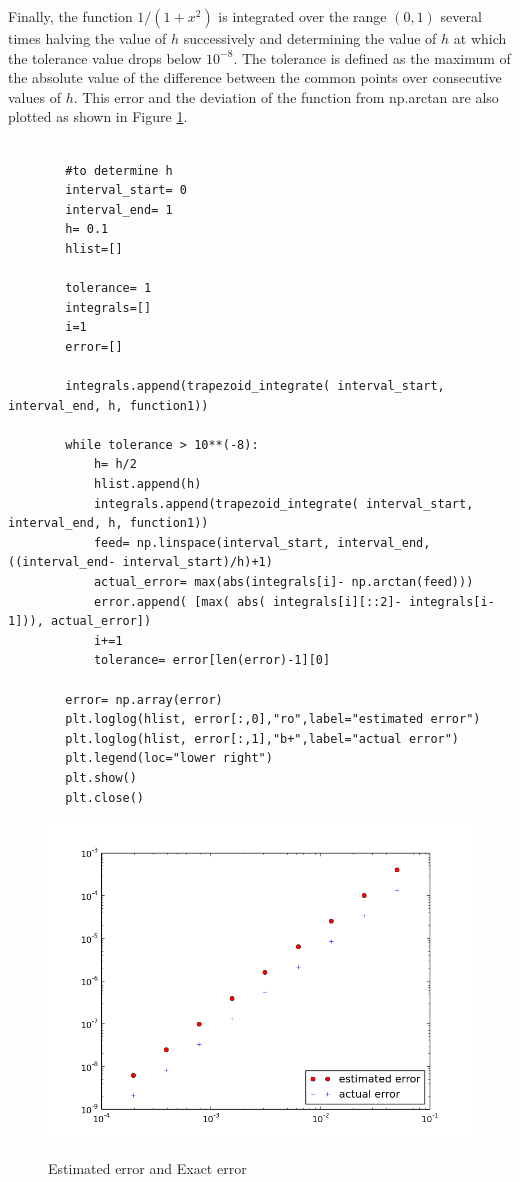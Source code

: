 \documentclass[a4paper, 12pt, margin= 1.25cm ]{article}
\begin{document}
\begin{enumerate}
		Finally, the function $1/(1+x^2)$ is integrated over the range $(0,1)$ several times halving the value of $h$ successively and determining the value of $h$ at which the tolerance value drops below $10^{-8}$. The tolerance is defined as the maximum of the absolute value of the difference between the common points over consecutive values of $h$. This error and the deviation of the function from np.arctan are also plotted as shown in Figure \ref{fig:figure3}.


		\begin{lstlisting}

		#to determine h
		interval_start= 0
		interval_end= 1
		h= 0.1
		hlist=[]

		tolerance= 1
		integrals=[]
		i=1
		error=[]

		integrals.append(trapezoid_integrate( interval_start, interval_end, h, function1))

		while tolerance > 10**(-8):
			h= h/2
			hlist.append(h)
			integrals.append(trapezoid_integrate( interval_start, interval_end, h, function1))
			feed= np.linspace(interval_start, interval_end,((interval_end- interval_start)/h)+1)
			actual_error= max(abs(integrals[i]- np.arctan(feed)))
			error.append( [max( abs( integrals[i][::2]- integrals[i-1])), actual_error])
			i+=1
			tolerance= error[len(error)-1][0]

		error= np.array(error)
		plt.loglog(hlist, error[:,0],"ro",label="estimated error")
		plt.loglog(hlist, error[:,1],"b+",label="actual error")
		plt.legend(loc="lower right")
		plt.show()
		plt.close()
		\end{lstlisting}

		\begin{figure}[H]
		\includegraphics[width= \linewidth]{figure3.png}
		\label{fig:figure3}
		\caption{Estimated error and Exact error} 	
		\end{figure}

	\end{enumerate}
\end{document}
